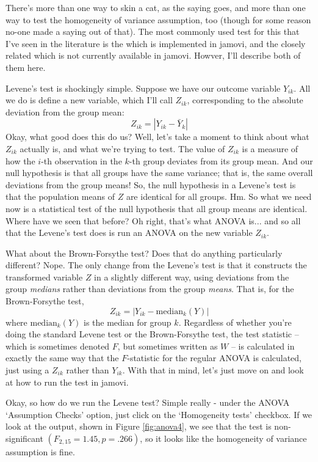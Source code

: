 There's more than one way to skin a cat, as the saying goes, and more than one way to test the homogeneity of variance assumption, too (though for some reason no-one made a saying out of that). The most commonly used test for this that I've seen in the literature is the  \cite{Levene1960} which is implemented in jamovi, and the closely related  \cite{BrownForsythe1974} which is not currently available in jamovi. Howver, I'll describe both of them here.

Levene's test is shockingly simple. Suppose we have our outcome variable $Y_{ik}$. All we do is define a new variable, which I'll call $Z_{ik}$, corresponding to the absolute deviation from the group mean:
$$
Z_{ik} = \left| Y_{ik} - \bar{Y}_k \right|
$$
Okay, what good does this do us? Well, let's take a moment to think about what $Z_{ik}$ actually is, and what we're trying to test. The value of $Z_{ik}$ is a measure of how the $i$-th observation in the $k$-th group deviates from its group mean. And our null hypothesis is that all groups have the same variance; that is, the same overall deviations from the group means! So, the null hypothesis in a Levene's test is that the population means of $Z$ are identical for all groups. Hm. So what we need now is a statistical test of the null hypothesis that all group means are identical. Where have we seen that before? Oh right, that's what ANOVA is... and so all that the Levene's test does is run an ANOVA on the new variable $Z_{ik}$. 

What about the Brown-Forsythe test? Does that do anything particularly different? Nope. The only change from the Levene's test is that it constructs the transformed variable $Z$ in a slightly different way, using deviations from the group {\it medians} rather than deviations from the group {\it means}. That is, for the Brown-Forsythe test, 
$$
Z_{ik} = \left| Y_{ik} - \mbox{median}_k(Y) \right|
$$
where $\mbox{median}_k(Y)$ is the median for group $k$. Regardless of whether you're doing the standard Levene test or the Brown-Forsythe test, the test statistic -- which is sometimes denoted $F$, but sometimes written as $W$ -- is  calculated in exactly the same way that the $F$-statistic for the regular ANOVA is calculated, just using a $Z_{ik}$ rather than $Y_{ik}$. With that in mind, let's just move on and look at how to run the test in jamovi.



Okay, so how do we run the Levene test? Simple really - under the ANOVA `Assumption Checks' option, just click on the `Homogeneity tests' checkbox. If we look at the output, shown in Figure \ref{fig:anova4}, we see that the test is non-significant $(F_{2,15} = 1.45, p = .266)$, so it looks like the homogeneity of variance assumption is fine. 

